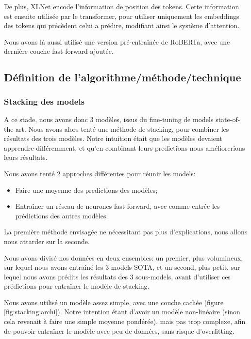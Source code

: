 \documentclass[11pt,a4paper, french]{article}
\begin{document}
De plus, XLNet encode l'information de position des tokens. Cette information est ensuite utilisée par le transformer, pour utiliser uniquement les embeddings des tokens qui précèdent celui a prédire, modifiant ainsi le système d'attention.

Nous avons là aussi utilisé une version pré-entraînée de RoBERTa, avec une dernière couche fast-forward ajoutée.

\subsection{Définition de l'algorithme/méthode/technique}

\subsubsection{Stacking des models}

A ce stade, nous avons donc 3 modèles, issus du fine-tuning de models state-of-the-art. Nous avons alors tenté une méthode de stacking, pour combiner les résultats des trois modèles. Notre intuition était que les modèles devaient apprendre différemment, et qu'en combinant leurs predictions nous améliorerions leurs résultats.

Nous avons tenté 2 approches différentes pour réunir les models:

\begin{itemize}
  \item Faire une moyenne des predictions des modèles;
  \item Entraîner un réseau de neurones fast-forward, avec comme entrée les prédictions des autres modèles.
\end{itemize}

La première méthode envisagée ne nécessitant pas plus d'explications, nous allons nous attarder sur la seconde.

Nous avons divisé nos données en deux ensembles: un premier, plus volumineux, sur lequel nous avons entraîné les 3 models SOTA, et un second, plus petit, sur lequel nous avons prédits les résultats des 3 sous-models, avant d'utiliser ces prédictions pour entraîner le modèle de stacking.

Nous avons utilisé un modèle assez simple, avec une couche cachée (figure \ref{fig:stacking:archi}). Notre intention étant d'avoir un modèle non-linéaire (sinon cela revenait à faire une simple moyenne pondérée), mais pas trop complexe, afin de pouvoir entraîner le modèle avec peu de données, sans risque d'overfitting.
\end{document}
